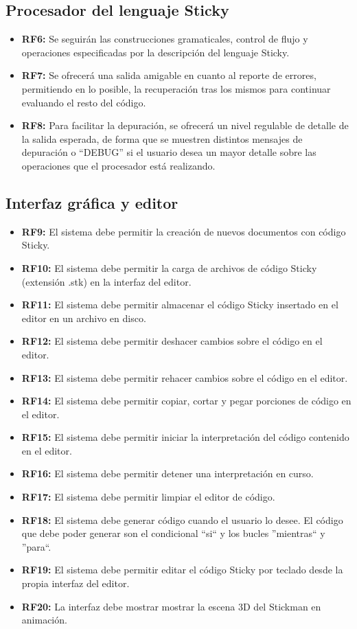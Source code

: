 \documentclass[11pt,a4paper]{report}
\begin{document}
\subsection{Procesador del lenguaje Sticky}
\label{sec-1.2.2}


\begin{itemize}
\item \textbf{RF6:} Se seguirán las construcciones gramaticales, control de flujo y operaciones especificadas por la descripción del lenguaje Sticky.
\item \textbf{RF7:} Se ofrecerá una salida amigable en cuanto al reporte de errores, permitiendo en lo posible, la recuperación tras los mismos para
		    continuar evaluando el resto del código.
\item \textbf{RF8:} Para facilitar la depuración, se ofrecerá un nivel regulable de detalle de la salida esperada, de forma que se muestren distintos
		    mensajes de depuración o ``DEBUG'' si el usuario desea un mayor detalle sobre las operaciones que el procesador está realizando.
\end{itemize}
\subsection{Interfaz gráfica y editor}
\label{sec-1.2.3}


\begin{itemize}
\item \textbf{RF9:} El sistema debe permitir la creación de nuevos documentos con código Sticky.
\item \textbf{RF10:} El sistema debe permitir la carga de archivos de código Sticky (extensión .stk) en la interfaz del editor.
\item \textbf{RF11:} El sistema debe permitir almacenar el código Sticky insertado en el editor en un archivo en disco.
\item \textbf{RF12:} El sistema debe permitir deshacer cambios sobre el código en el editor.
\item \textbf{RF13:} El sistema debe permitir rehacer cambios sobre el código en el editor.
\item \textbf{RF14:} El sistema debe permitir copiar, cortar y pegar porciones de código en el editor.
\item \textbf{RF15:} El sistema debe permitir iniciar la interpretación del código contenido en el editor.
\item \textbf{RF16:} El sistema debe permitir detener una interpretación en curso.
\item \textbf{RF17:} El sistema debe permitir limpiar el editor de código.
\item \textbf{RF18:} El sistema debe generar código cuando el usuario lo desee. El código que debe poder generar son el condicional ``si`` y los bucles
		    ''mientras`` y ''para``.
\item \textbf{RF19:} El sistema debe permitir editar el código Sticky por teclado desde la propia interfaz del editor.
\item \textbf{RF20:} La interfaz debe mostrar mostrar la escena 3D del Stickman en animación.
\end{itemize}
\end{document}
